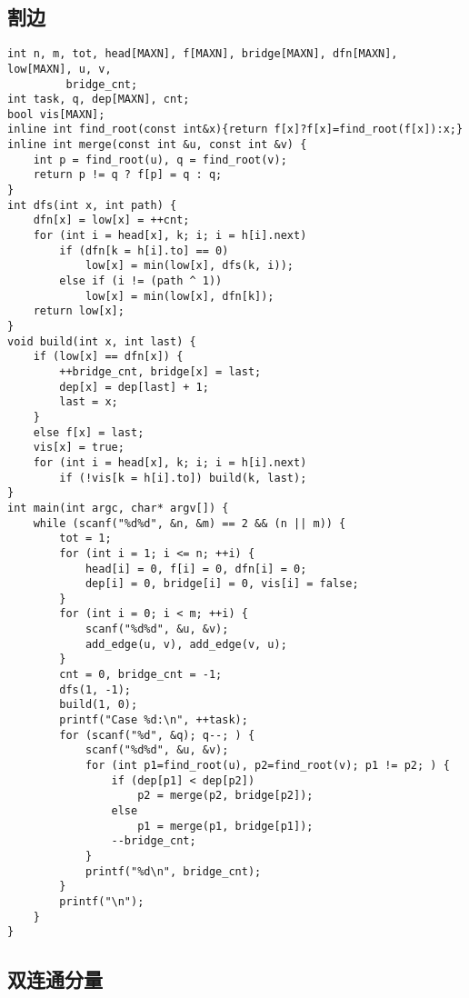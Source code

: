 \documentclass{article}
\begin{document}
\subsection{割边}

\begin{lstlisting}
int n, m, tot, head[MAXN], f[MAXN], bridge[MAXN], dfn[MAXN], low[MAXN], u, v,
         bridge_cnt;
int task, q, dep[MAXN], cnt;
bool vis[MAXN];
inline int find_root(const int&x){return f[x]?f[x]=find_root(f[x]):x;}
inline int merge(const int &u, const int &v) {
    int p = find_root(u), q = find_root(v);
    return p != q ? f[p] = q : q;
}
int dfs(int x, int path) {
    dfn[x] = low[x] = ++cnt;
    for (int i = head[x], k; i; i = h[i].next)
        if (dfn[k = h[i].to] == 0)
            low[x] = min(low[x], dfs(k, i));
        else if (i != (path ^ 1))
            low[x] = min(low[x], dfn[k]);
    return low[x];
}
void build(int x, int last) {
    if (low[x] == dfn[x]) {
        ++bridge_cnt, bridge[x] = last;
        dep[x] = dep[last] + 1;
        last = x;
    }
    else f[x] = last;
    vis[x] = true;
    for (int i = head[x], k; i; i = h[i].next)
        if (!vis[k = h[i].to]) build(k, last);
}
int main(int argc, char* argv[]) {
    while (scanf("%d%d", &n, &m) == 2 && (n || m)) {
        tot = 1;
        for (int i = 1; i <= n; ++i) {
            head[i] = 0, f[i] = 0, dfn[i] = 0;
            dep[i] = 0, bridge[i] = 0, vis[i] = false;
        }
        for (int i = 0; i < m; ++i) {
            scanf("%d%d", &u, &v);
            add_edge(u, v), add_edge(v, u);
        }
        cnt = 0, bridge_cnt = -1;
        dfs(1, -1);
        build(1, 0);
        printf("Case %d:\n", ++task);
        for (scanf("%d", &q); q--; ) {
            scanf("%d%d", &u, &v);
            for (int p1=find_root(u), p2=find_root(v); p1 != p2; ) {
                if (dep[p1] < dep[p2])
                    p2 = merge(p2, bridge[p2]);
                else
                    p1 = merge(p1, bridge[p1]);
                --bridge_cnt;
            }
            printf("%d\n", bridge_cnt);
        }
        printf("\n");
    }
}
\end{lstlisting}

\subsection{双连通分量}
\end{document}
